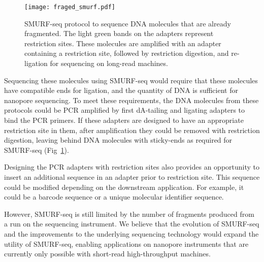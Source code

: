 \begin{figure}[t!]
\centering
\texttt{[image: fraged\_smurf.pdf]}
\caption[SMURF-seq protocol to sequence pre-fragmented DNA molecules]{
  SMURF-seq protocol to sequence DNA molecules that are
  already fragmented. The light green bands
  on the adapters represent restriction sites. These molecules are
  amplified with an adapter containing a restriction site, followed by
  restriction digestion, and re-ligation for sequencing on long-read
  machines.}
\label{fraged_smurf}
\end{figure}

%
Sequencing these molecules using SMURF-seq would require that these
molecules have compatible ends for ligation, and the quantity of DNA is
sufficient for nanopore sequencing.
To meet these requirements, the DNA molecules from these protocols
could be PCR amplified by first dA-tailing and
ligating adapters to bind the PCR primers. If these adapters are
designed to have an
appropriate restriction site in them, after amplification they could be
removed with restriction digestion, leaving behind DNA molecules with
sticky-ends as required for SMURF-seq (Fig~\ref{fraged_smurf}).

Designing the PCR adapters with restriction sites  also provides an
opportunity to insert an additional sequence in an adapter prior to
restriction site. This sequence could be modified depending on the
downstream application. For example, it could be a barcode sequence or a
unique molecular identifier sequence.

However, SMURF-seq is still limited by the number of fragments produced
from a run on the sequencing instrument.  We believe that the evolution
of SMURF-seq and the improvements to the underlying sequencing
technology would expand the utility of SMURF-seq, enabling applications
on nanopore instruments that are currently only possible with short-read
high-throughput machines.
